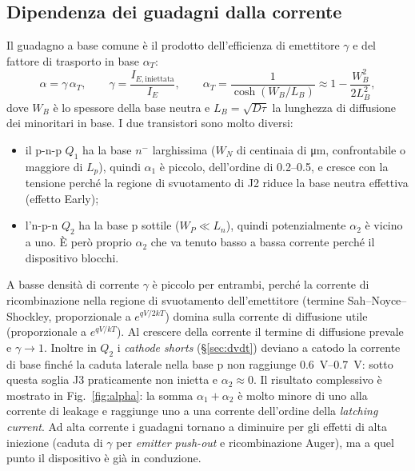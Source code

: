 \documentclass[11pt,a4paper]{article}
\newcommand{\en}[1]{\emph{#1}}   %
\begin{document}
\subsection{Dipendenza dei guadagni dalla corrente}
\label{sec:alpha}
Il guadagno a base comune è il prodotto dell'efficienza di emettitore $\gamma$ e del fattore di trasporto in base $\alpha_T$:
\begin{equation}
  \alpha = \gamma\,\alpha_T, \qquad
  \gamma = \frac{I_{E,\text{iniettata}}}{I_E}, \qquad
  \alpha_T = \frac{1}{\cosh(W_B/L_B)} \approx 1 - \frac{W_B^2}{2L_B^2},
  \label{eq:alpha}
\end{equation}
dove $W_B$ è lo spessore della base neutra e $L_B=\sqrt{D\tau}$ la lunghezza di diffusione dei minoritari in base. I due transistori sono molto diversi:
\begin{itemize}
  \item il p-n-p $Q_1$ ha la base $n^-$ larghissima ($W_N$ di centinaia di \unit{\um}, confrontabile o maggiore di $L_p$), quindi $\alpha_1$ è piccolo, dell'ordine di \numrange{0.2}{0.5}, e cresce con la tensione perché la regione di svuotamento di J2 riduce la base neutra effettiva (effetto Early);
  \item l'n-p-n $Q_2$ ha la base p sottile ($W_P\ll L_n$), quindi potenzialmente $\alpha_2$ è vicino a uno. È però proprio $\alpha_2$ che va tenuto basso a bassa corrente perché il dispositivo blocchi.
\end{itemize}
A basse densità di corrente $\gamma$ è piccolo per entrambi, perché la corrente di ricombinazione nella regione di svuotamento dell'emettitore (termine Sah--Noyce--Shockley, proporzionale a $e^{qV/2kT}$) domina sulla corrente di diffusione utile (proporzionale a $e^{qV/kT}$). Al crescere della corrente il termine di diffusione prevale e $\gamma\to1$. Inoltre in $Q_2$ i \en{cathode shorts} (\S\ref{sec:dvdt}) deviano a catodo la corrente di base finché la caduta laterale nella base p non raggiunge \qtyrange{0.6}{0.7}{\V}: sotto questa soglia J3 praticamente non inietta e $\alpha_2\approx0$. Il risultato complessivo è mostrato in Fig.~\ref{fig:alpha}: la somma $\alpha_1+\alpha_2$ è molto minore di uno alla corrente di leakage e raggiunge uno a una corrente dell'ordine della \en{latching current}. Ad alta corrente i guadagni tornano a diminuire per gli effetti di alta iniezione (caduta di $\gamma$ per \en{emitter push-out} e ricombinazione Auger), ma a quel punto il dispositivo è già in conduzione.
\end{document}
